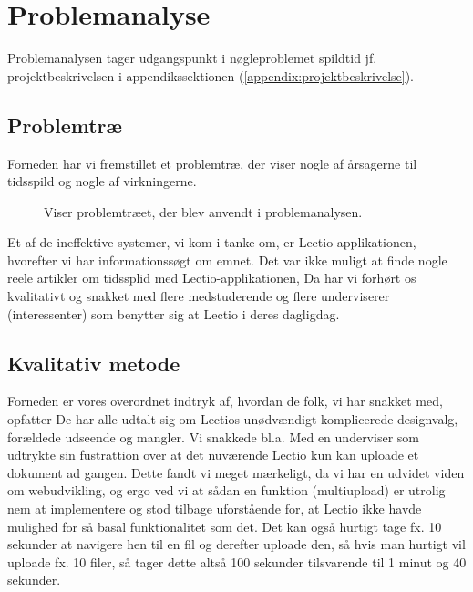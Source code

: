 \section{Problemanalyse}
Problemanalysen tager udgangspunkt i nøgleproblemet spildtid jf. projektbeskrivelsen i appendikssektionen (\ref{appendix:projektbeskrivelse}). 


\subsection{Problemtræ}
Forneden har vi fremstillet et problemtræ, der viser nogle af årsagerne til tidsspild og nogle af virkningerne.
\begin{figure}[H]
    \centering
    \caption{Viser problemtræet, der blev anvendt i problemanalysen.}
\end{figure}
Et af de ineffektive systemer, vi kom i tanke om, er Lectio-applikationen, hvorefter vi har informationssøgt om emnet. Det var ikke muligt at finde nogle reele artikler om tidssplid med Lectio-applikationen, 
Da har vi forhørt os kvalitativt og snakket med flere medstuderende og flere underviserer (interessenter) som benytter sig at Lectio i deres dagligdag.
\subsection{Kvalitativ metode}
Forneden er vores overordnet indtryk af, hvordan de folk, vi har snakket med, opfatter
De har alle udtalt sig om Lectios unødvændigt komplicerede designvalg, forældede udseende og mangler. Vi snakkede bl.a. Med en underviser som udtrykte sin fustrattion over 
at det nuværende Lectio kun kan uploade et dokument ad gangen. Dette fandt vi meget mærkeligt, da vi har en udvidet viden om webudvikling, og ergo ved vi at sådan en funktion (multiupload) er utrolig nem at 
implementere og stod tilbage uforstående for, at Lectio ikke havde mulighed for så basal funktionalitet som det. Det kan også hurtigt tage fx. 10 sekunder at navigere hen til en fil og derefter uploade den, så hvis man hurtigt vil uploade fx. 10 filer, så tager dette altså 100 sekunder tilsvarende til 1 minut og 40 sekunder. 

